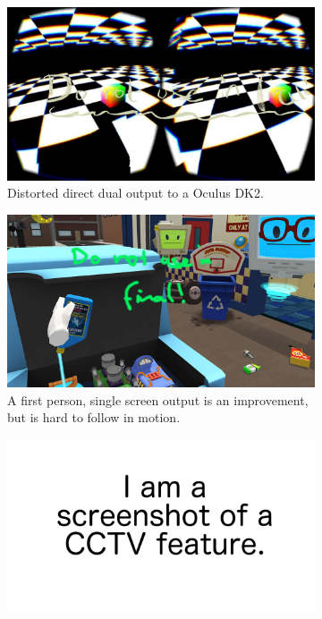 \begin{figure}[htbp]
	\label{fig:evolution:steps}
	\begin{subfigure}[t]{.45\textwidth}
		\centering
		\includegraphics[width=\textwidth]{_raw_resources/lens_distortion.jpeg}
		\caption{Distorted direct dual output to a Oculus DK2.}
	\end{subfigure}
	\begin{subfigure}[t]{.45\textwidth}
		\centering
		\includegraphics[width=\textwidth]{_raw_resources/job_simulator_vr.png}
		\caption{A first person, single screen output is an improvement, but is 
			hard to follow in motion.}
	\end{subfigure}
	\newline
	\begin{subfigure}[t]{.45\textwidth}
		\centering
		\includegraphics[width=\textwidth]{_raw_resources/rickality_cctv.png}

\end{subfigure}
\end{figure}
